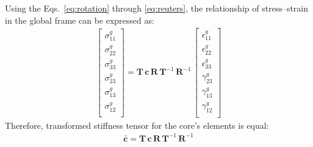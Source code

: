 \documentclass[a4paper,fleqn]{cas-sc}
\begin{document}
Using the Eqs.~\ref{eq:rotation} through \ref{eq:reuters}, the relationship of stress--strain in the global frame can be expressed as:
\begin{eqnarray}
	\left [
	\begin{array}{c}
		\sigma^g_{11}\\
		\sigma^g_{22}\\ 
		\sigma^g_{33}\\ 
		\sigma^g_{23}\\
		\sigma^g_{13}\\
		\sigma^g_{12}\\
	\end{array}
	\right ]=
	\textbf{T}\,\textbf{c}\,\textbf{R}\,\textbf{T}^{-1}\,\textbf{R}^{-1}\,
	\left [
	\begin{array}{c}
		\epsilon^g_{11}\\
		\epsilon^g_{22}\\ 
		\epsilon^g_{33}\\
		\gamma^g_{23}\\
		\gamma^g_{13}\\
		\gamma^g_{12}\\
	\end{array}
	\right ]
	\label{eq:stress-strain}
\end{eqnarray}
Therefore, transformed stiffness tensor for the core's elements is equal:
\begin{eqnarray}
	\bar{\textbf{c}}=\textbf{T}\,\textbf{c}\,\textbf{R}\,\textbf{T}^{-1}\,\textbf{R}^{-1}
	\label{eq:c_global}
\end{eqnarray}


%



\end{document}
